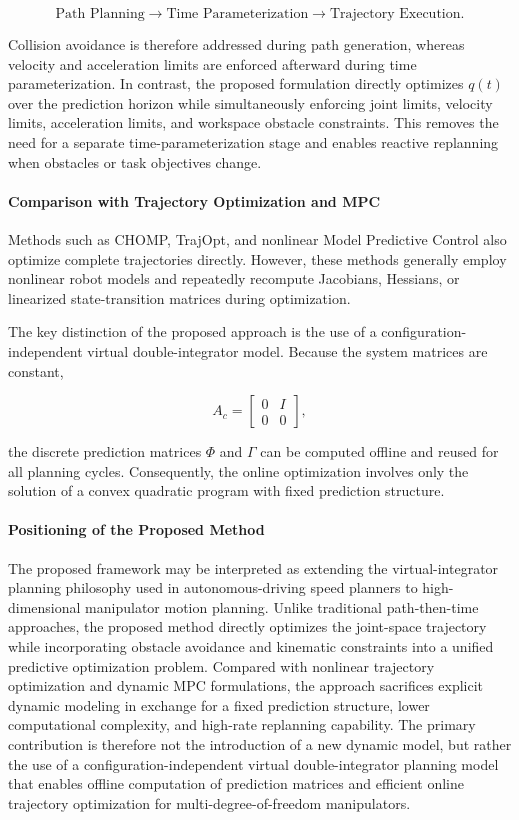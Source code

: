 \[\text{Path Planning} \rightarrow
\text{Time Parameterization} \rightarrow
\text{Trajectory Execution}. \]

Collision avoidance is therefore addressed during path generation,
whereas velocity and acceleration limits are enforced afterward during
time parameterization. In contrast, the proposed formulation directly
optimizes \(q(t)\) over the prediction horizon while simultaneously
enforcing joint limits, velocity limits, acceleration limits, and
workspace obstacle constraints. This removes the need for a separate
time-parameterization stage and enables reactive replanning when
obstacles or task objectives change.

\paragraph{Comparison with Trajectory Optimization and
MPC}\label{comparison-with-trajectory-optimization-and-mpc}

Methods such as CHOMP, TrajOpt, and nonlinear Model Predictive Control
also optimize complete trajectories directly. However, these methods
generally employ nonlinear robot models and repeatedly recompute
Jacobians, Hessians, or linearized state-transition matrices during
optimization.

The key distinction of the proposed approach is the use of a
configuration-independent virtual double-integrator model. Because the
system matrices are constant,

\[
A_c= \begin{bmatrix}
0&I\\ 0&0
\end{bmatrix},
\]

the discrete prediction matrices \(\Phi\) and \(\Gamma\) can be computed
offline and reused for all planning cycles. Consequently, the online
optimization involves only the solution of a convex quadratic program
with fixed prediction structure.

\paragraph{Positioning of the Proposed
Method}\label{positioning-of-the-proposed-method}

The proposed framework may be interpreted as extending the
virtual-integrator planning philosophy used in autonomous-driving speed
planners to high-dimensional manipulator motion planning. Unlike
traditional path-then-time approaches, the proposed method directly
optimizes the joint-space trajectory while incorporating obstacle
avoidance and kinematic constraints into a unified predictive
optimization problem. Compared with nonlinear trajectory optimization
and dynamic MPC formulations, the approach sacrifices explicit dynamic
modeling in exchange for a fixed prediction structure, lower
computational complexity, and high-rate replanning capability. The
primary contribution is therefore not the introduction of a new dynamic
model, but rather the use of a configuration-independent virtual
double-integrator planning model that enables offline computation of
prediction matrices and efficient online trajectory optimization for
multi-degree-of-freedom manipulators.


